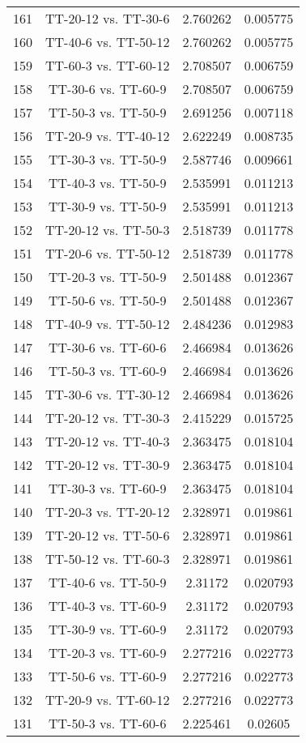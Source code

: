 \documentclass[a4paper,10pt]{article}
\begin{document}
\begin{landscape}
\begin{table}[!htp]
\begin{tabular}{cccc}
161&TT-20-12 vs. TT-30-6&2.760262&0.005775\\
160&TT-40-6 vs. TT-50-12&2.760262&0.005775\\
159&TT-60-3 vs. TT-60-12&2.708507&0.006759\\
158&TT-30-6 vs. TT-60-9&2.708507&0.006759\\
157&TT-50-3 vs. TT-50-9&2.691256&0.007118\\
156&TT-20-9 vs. TT-40-12&2.622249&0.008735\\
155&TT-30-3 vs. TT-50-9&2.587746&0.009661\\
154&TT-40-3 vs. TT-50-9&2.535991&0.011213\\
153&TT-30-9 vs. TT-50-9&2.535991&0.011213\\
152&TT-20-12 vs. TT-50-3&2.518739&0.011778\\
151&TT-20-6 vs. TT-50-12&2.518739&0.011778\\
150&TT-20-3 vs. TT-50-9&2.501488&0.012367\\
149&TT-50-6 vs. TT-50-9&2.501488&0.012367\\
148&TT-40-9 vs. TT-50-12&2.484236&0.012983\\
147&TT-30-6 vs. TT-60-6&2.466984&0.013626\\
146&TT-50-3 vs. TT-60-9&2.466984&0.013626\\
145&TT-30-6 vs. TT-30-12&2.466984&0.013626\\
144&TT-20-12 vs. TT-30-3&2.415229&0.015725\\
143&TT-20-12 vs. TT-40-3&2.363475&0.018104\\
142&TT-20-12 vs. TT-30-9&2.363475&0.018104\\
141&TT-30-3 vs. TT-60-9&2.363475&0.018104\\
140&TT-20-3 vs. TT-20-12&2.328971&0.019861\\
139&TT-20-12 vs. TT-50-6&2.328971&0.019861\\
138&TT-50-12 vs. TT-60-3&2.328971&0.019861\\
137&TT-40-6 vs. TT-50-9&2.31172&0.020793\\
136&TT-40-3 vs. TT-60-9&2.31172&0.020793\\
135&TT-30-9 vs. TT-60-9&2.31172&0.020793\\
134&TT-20-3 vs. TT-60-9&2.277216&0.022773\\
133&TT-50-6 vs. TT-60-9&2.277216&0.022773\\
132&TT-20-9 vs. TT-60-12&2.277216&0.022773\\
131&TT-50-3 vs. TT-60-6&2.225461&0.02605\\

\end{tabular}
\end{table}
\end{landscape}
\end{document}
